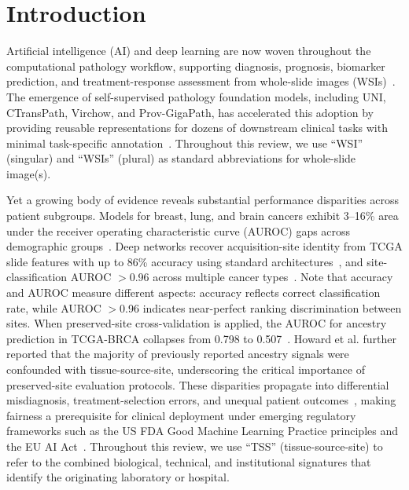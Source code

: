 
\section{Introduction}
\label{sec:introduction}

Artificial intelligence (AI) and deep learning are now woven throughout the computational pathology workflow, supporting diagnosis, prognosis, biomarker prediction, and treatment-response assessment from whole-slide images (WSIs)~\citep{tiwari2025current, chang2026applications}. The emergence of self-supervised pathology foundation models, including UNI, CTransPath, Virchow, and Prov-GigaPath, has accelerated this adoption by providing reusable representations for dozens of downstream clinical tasks with minimal task-specific annotation~\citep{ochi2024pathology}. Throughout this review, we use ``WSI'' (singular) and ``WSIs'' (plural) as standard abbreviations for whole-slide image(s).

Yet a growing body of evidence reveals substantial performance disparities across patient subgroups. Models for breast, lung, and brain cancers exhibit 3--16\% area under the receiver operating characteristic curve (AUROC) gaps across demographic groups~\citep{vaidya2024demographic, lin2025contrastive}. Deep networks recover acquisition-site identity from TCGA slide features with up to 86\% accuracy using standard architectures~\citep{dehkharghanian2023biased}, and site-classification AUROC $>$0.96 across multiple cancer types~\citep{howard2021site, komen2024batch}. Note that accuracy and AUROC measure different aspects: accuracy reflects correct classification rate, while AUROC $>$0.96 indicates near-perfect ranking discrimination between sites. When preserved-site cross-validation is applied, the AUROC for ancestry prediction in TCGA-BRCA collapses from 0.798 to 0.507~\citep{howard2021site}. Howard et al. further reported that the majority of previously reported ancestry signals were confounded with tissue-source-site, underscoring the critical importance of preserved-site evaluation protocols. These disparities propagate into differential misdiagnosis, treatment-selection errors, and unequal patient outcomes~\citep{chen2023algorithmic, celi2022sources, norori2021addressing}, making fairness a prerequisite for clinical deployment under emerging regulatory frameworks such as the US FDA Good Machine Learning Practice principles and the EU AI Act~\citep{cheng2021challenges}. Throughout this review, we use ``TSS'' (tissue-source-site) to refer to the combined biological, technical, and institutional signatures that identify the originating laboratory or hospital.

